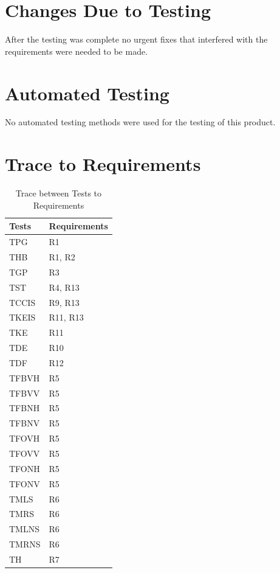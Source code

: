 \documentclass[12pt, titlepage]{article}
\begin{document}
\section{Changes Due to Testing}
After the testing was complete no urgent fixes that interfered with the requirements were needed to be made.

\section{Automated Testing}
No automated testing methods were used for the testing of this product.
		
\section{Trace to Requirements}
\begin{table}[H]
\begin{tabular}{ll}
\toprule
Tests & Requirements \\
\midrule
TPG & R1 \\
THB & R1, R2 \\
TGP & R3 \\
TST & R4, R13 \\
TCCIS & R9, R13 \\
TKEIS & R11, R13 \\
TKE & R11 \\
TDE & R10 \\
TDF & R12 \\
TFBVH & R5 \\
TFBVV & R5 \\
TFBNH & R5 \\
TFBNV & R5 \\
TFOVH & R5 \\
TFOVV & R5 \\
TFONH & R5 \\
TFONV & R5 \\
TMLS & R6 \\
TMRS & R6 \\
TMLNS & R6 \\
TMRNS & R6 \\
TH & R7\\
\midrule
\end{tabular}
\caption{Trace between Tests to Requirements}
\label{Table}
\end{table}
	
\end{document}
